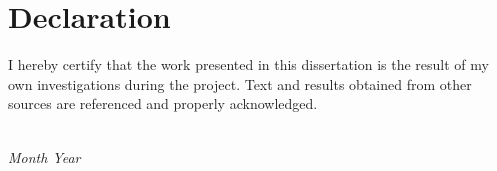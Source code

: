 \chapter*{Declaration}

I hereby certify that the work presented in this dissertation is the result of my own investigations during the \degree{} project.
Text and results obtained from other sources are referenced and properly acknowledged.

\begin{flushright}
\it \name\\
Month Year
\end{flushright}

